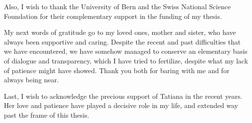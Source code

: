 \begin{acknowledgements}
\bigskip
Also, I wish to thank the University of Bern and the Swiss National Science Foundation for their complementary support in the funding of my thesis.

\bigskip
My next words of gratitude go to my loved ones, mother and sister, who have always been supportive and caring.
Despite the recent and past difficulties that we have encountered, we have somehow managed to conserve an elementary basis of dialogue and transparency, which I have tried to fertilize, despite what my lack of patience might have showed.
Thank you both for baring with me and for always being near.

\bigskip
Last, I wish to acknowledge the precious support of Tatiana in the recent years.
Her love and patience have played a decisive role in my life, and extended way past the frame of this thesis.


\end{acknowledgements}

